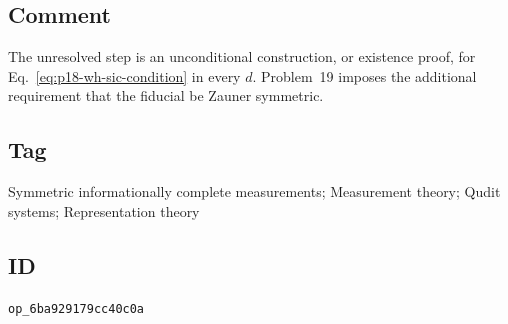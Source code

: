 \subsection*{Comment}

The unresolved step is an unconditional construction, or existence proof, for
Eq.~\eqref{eq:p18-wh-sic-condition} in every $d$.  Problem~19 imposes the
additional requirement that the fiducial be Zauner symmetric.

\subsection*{Tag}

Symmetric informationally complete measurements; Measurement theory;
Qudit systems; Representation theory

\subsection*{ID}

\texttt{op\_6ba929179cc40c0a}
